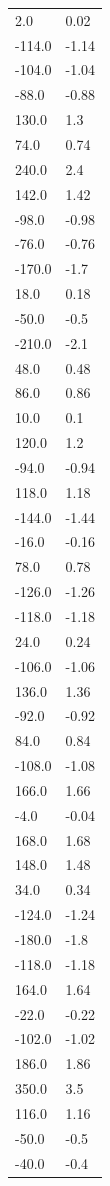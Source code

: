 \begin{longtable}{ll}
2.0 & 0.02 \\
-114.0 & -1.14 \\
-104.0 & -1.04 \\
-88.0 & -0.88 \\
130.0 & 1.3 \\
74.0 & 0.74 \\
240.0 & 2.4 \\
142.0 & 1.42 \\
-98.0 & -0.98 \\
-76.0 & -0.76 \\
-170.0 & -1.7 \\
18.0 & 0.18 \\
-50.0 & -0.5 \\
-210.0 & -2.1 \\
48.0 & 0.48 \\
86.0 & 0.86 \\
10.0 & 0.1 \\
120.0 & 1.2 \\
-94.0 & -0.94 \\
118.0 & 1.18 \\
-144.0 & -1.44 \\
-16.0 & -0.16 \\
78.0 & 0.78 \\
-126.0 & -1.26 \\
-118.0 & -1.18 \\
24.0 & 0.24 \\
-106.0 & -1.06 \\
136.0 & 1.36 \\
-92.0 & -0.92 \\
84.0 & 0.84 \\
-108.0 & -1.08 \\
166.0 & 1.66 \\
-4.0 & -0.04 \\
168.0 & 1.68 \\
148.0 & 1.48 \\
34.0 & 0.34 \\
-124.0 & -1.24 \\
-180.0 & -1.8 \\
-118.0 & -1.18 \\
164.0 & 1.64 \\
-22.0 & -0.22 \\
-102.0 & -1.02 \\
186.0 & 1.86 \\
350.0 & 3.5 \\
116.0 & 1.16 \\
-50.0 & -0.5 \\
-40.0 & -0.4 \\

\end{longtable}
